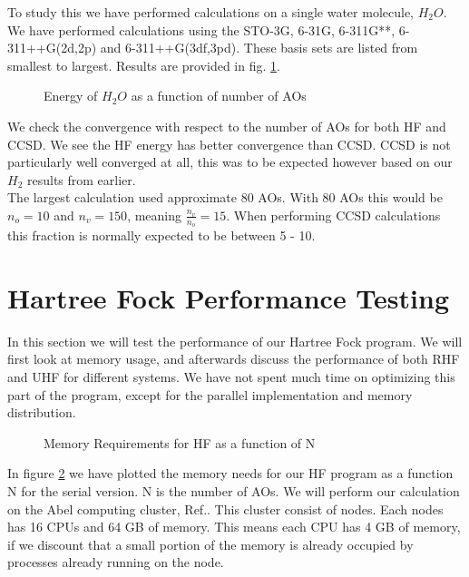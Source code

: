 To study this we have performed calculations on a single water molecule, $H_2O$. We have performed calculations using the STO-3G, 6-31G, 6-311G**, 6-311++G(2d,2p) and 6-311++G(3df,3pd). These basis sets are listed from smallest to largest. Results are provided in fig. \ref{fig:convplot}. \\

\begin{figure}[h!]
\begin{center}
\caption{Energy of $H_2O$ as a function of number of AOs}
\label{fig:convplot}
\end{center}
\end{figure} 

We check the convergence with respect to the number of AOs for both HF and CCSD. We see the HF energy has better convergence than CCSD. CCSD is not particularly well converged at all, this was to be expected however based on our $H_2$ results from earlier. \\

The largest calculation used approximate 80 AOs. With 80 AOs this would be $n_o = 10$ and $n_v = 150$, meaning $\frac{n_v}{n_o} = 15$. When performing CCSD calculations this fraction is normally expected to be between 5 - 10.

\section{Hartree Fock Performance Testing}
In this section we will test the performance of our Hartree Fock program. We will first look at memory usage, and afterwards discuss the performance of both RHF and UHF for different systems. We have not spent much time on optimizing this part of the program, except for the parallel implementation and memory distribution. \\

\begin{figure}[h!]
\begin{center}
\caption{Memory Requirements for HF as a function of N}
\label{fig:memory_needs}
\end{center}
\end{figure}

In figure \ref{fig:memory_needs} we have plotted the memory needs for our HF program as a function N for the serial version. N is the number of AOs. We will perform our calculation on the Abel computing cluster, Ref.\cite{abel_po_g_citation1234567}. This cluster consist of nodes. Each nodes has 16 CPUs and 64 GB of memory. This means each CPU has 4 GB of memory, if we discount that a small portion of the memory is already occupied by processes already running on the node. \\


